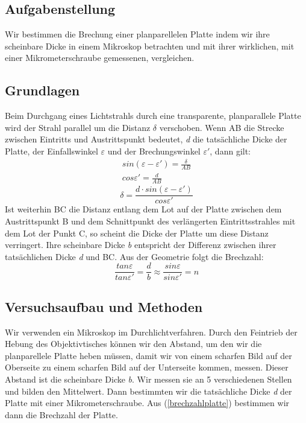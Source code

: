 \documentclass{article}
\begin{document}
\subsection{Aufgabenstellung}
Wir bestimmen die Brechung einer planparellelen Platte indem wir ihre scheinbare Dicke in einem Mikroskop betrachten und mit ihrer wirklichen, mit einer Mikrometerschraube gemessenen, vergleichen.
\subsection{Grundlagen}
Beim Durchgang eines Lichtstrahls durch eine transparente, planparallele Platte wird der Strahl parallel um die Distanz $\delta$ verschoben. Wenn AB die Strecke zwischen Eintritts und Austrittspunkt bedeutet, \textit{d} die tatsächliche Dicke der Platte, der Einfallswinkel $\varepsilon$ und der Brechungswinkel $\varepsilon '$, dann gilt:
\begin{gather*}
sin(\varepsilon-\varepsilon ') = \frac{\delta}{AB} \\
cos \varepsilon ' = \frac{d}{AB}  
\end{gather*}
\begin{equation}
\label{distanzdelta}
\delta =\frac{d\cdot sin(\varepsilon - \varepsilon ')}{cos\varepsilon '}
\end{equation}
Ist weiterhin BC die Distanz entlang dem Lot auf der Platte zwischen dem Austrittspunkt B und dem Schnittpunkt des verlängerten Eintrittsstrahles mit dem Lot der Punkt C, so scheint die Dicke der Platte um diese Distanz verringert. Ihre scheinbare Dicke \textit{b} entspricht der Differenz zwischen ihrer tatsächlichen Dicke \textit{d} und BC. Aus der Geometrie folgt die Brechzahl: 
\begin{equation}
\label{brechzahlplatte}
\frac{tan\varepsilon}{tan\varepsilon '}=\frac{d}{b}\approx\frac{sin\varepsilon}{sin\varepsilon '} = n
\end{equation}
\subsection{Versuchsaufbau und Methoden}
Wir verwenden ein Mikroskop im Durchlichtverfahren. Durch den Feintrieb der Hebung des Objektivtisches können wir den Abstand, um den wir die planparellele Platte heben müssen, damit wir von einem scharfen Bild auf der Oberseite zu einem scharfen Bild auf der Unterseite kommen, messen. Dieser Abstand ist die scheinbare Dicke \textit{b}. Wir messen sie an 5 verschiedenen Stellen und bilden den Mittelwert. Dann bestimmten wir die tatsächliche Dicke \textit{d} der Platte mit einer Mikrometerschraube. Aus (\ref{brechzahlplatte}) bestimmen wir dann die Brechzahl der Platte.
\end{document}
